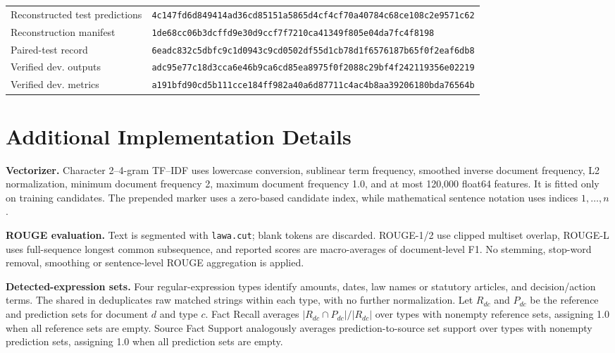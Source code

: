 \documentclass[10pt,twocolumn,letterpaper]{article}
\begin{document}
\begin{minipage}{\columnwidth}
\begin{tabularx}{\columnwidth}{@{}>{\raggedright\arraybackslash}p{}>{\raggedright\arraybackslash}X@{}}
Reconstructed test predictions & {\scriptsize\texttt{4c147fd6\allowbreak d849414a\allowbreak d36cd851\allowbreak 51a5865d\allowbreak 4cf4cf70\allowbreak a40784c6\allowbreak 8ce108c2\allowbreak e9571c62}} \\
Reconstruction manifest & {\scriptsize\texttt{1de68cc0\allowbreak 6b3dcffd\allowbreak 9e30d9cc\allowbreak 23176680\allowbreak f7f7210c\allowbreak a41349f8\allowbreak 05e04da7\allowbreak fc4f8198}} \\
Paired-test record & {\scriptsize\texttt{6eadc832\allowbreak c5dbfc9c\allowbreak 1d0943c9\allowbreak cd0502df\allowbreak 55d1cb78\allowbreak d1f65761\allowbreak 87b65f0f\allowbreak 2eaf6db8}} \\
Verified dev. outputs & {\scriptsize\texttt{adc95e77\allowbreak c18d3cca\allowbreak 6e46b9ca\allowbreak 6cd85ea8\allowbreak 975f0f20\allowbreak 88c29bf4\allowbreak f2421193\allowbreak 56e02219}} \\
Verified dev. metrics & {\scriptsize\texttt{a191bfd9\allowbreak 0cd5b111\allowbreak cce184ff\allowbreak 982a40a6\allowbreak d87711c4\allowbreak ac4b8aa3\allowbreak 9206180b\allowbreak da76564b}} \\
\bottomrule
\end{tabularx}
\end{minipage}

\section{Additional Implementation Details}\label{appendix-g-implementation}
\textbf{Vectorizer.} Character 2--4-gram TF--IDF uses lowercase conversion, sublinear term frequency, smoothed inverse document frequency, L2 normalization, minimum document frequency 2, maximum document frequency 1.0, and at most 120,000 float64 features. It is fitted only on training candidates. The prepended marker uses a zero-based candidate index, while mathematical sentence notation uses indices $1,\ldots,n$.

\textbf{ROUGE evaluation.} Text is segmented with \texttt{lawa.cut}; blank tokens are discarded. ROUGE-1/2 use clipped multiset overlap, ROUGE-L uses full-sequence longest common subsequence, and reported scores are macro-averages of document-level F1. No stemming, stop-word removal, smoothing or sentence-level ROUGE aggregation is applied.

\textbf{Detected-expression sets.} Four regular-expression types identify amounts, dates, law names or statutory articles, and decision/action terms. The shared  in  deduplicates raw matched strings within each type, with no further normalization. Let $R_{dc}$ and $P_{dc}$ be the reference and prediction sets for document $d$ and type $c$. Fact Recall averages $|R_{dc}\cap P_{dc}|/|R_{dc}|$ over types with nonempty reference sets, assigning 1.0 when all reference sets are empty. Source Fact Support analogously averages prediction-to-source set support over types with nonempty prediction sets, assigning 1.0 when all prediction sets are empty.
\end{document}
